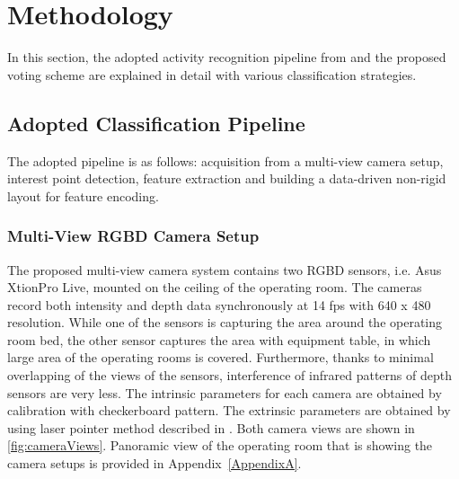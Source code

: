 
\chapter{Methodology} %

\label{Chapter3} %



	In this section, the adopted activity recognition pipeline from \cite{twinanda2015data} and the proposed voting scheme are explained in detail with various classification strategies.


\section{Adopted Classification Pipeline \citep{twinanda2015data}}
\label{section:AdoptedClassificationPipeline}
The adopted pipeline \cite{twinanda2015data} is as follows: acquisition from a multi-view camera setup, interest point detection, feature extraction and building a data-driven non-rigid layout for feature encoding.

\subsection{Multi-View RGBD Camera Setup}
\label{section:MultiViewRGBDCameraSetup}
    The proposed multi-view camera system contains two RGBD sensors, i.e. Asus XtionPro Live, mounted on the ceiling of the operating room. The cameras record both intensity and depth data synchronously at 14 fps with 640 x 480 resolution. While one of the sensors is capturing the area around the operating room bed, the other sensor captures the area with equipment table, in which large area of the operating rooms is covered.
    Furthermore, thanks to minimal overlapping of the views of the sensors, interference of infrared patterns of depth sensors are very less. The intrinsic parameters for each camera are obtained by calibration with checkerboard pattern. The extrinsic parameters are obtained  by using laser pointer method described in \cite{7035826}. Both camera views are shown in \ref{fig:cameraViews}. Panoramic view of the operating room that is showing the camera setups is provided in Appendix~\ref{AppendixA}.
    
